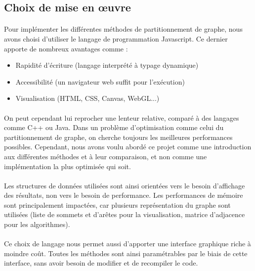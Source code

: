 \documentclass[12pt]{article}
\begin{document}
\subsection{Choix de mise en œuvre}

\paragraph{}Pour implémenter les différentes méthodes de partitionnement de graphe, nous avons choisi d'utiliser le langage de programmation Javascript. Ce dernier apporte de nombreux avantages comme :
\begin{itemize}
	\item Rapidité d'écriture (langage interprété à typage dynamique)
	\item Accessibilité (un navigateur web suffit pour l'exécution)
	\item Visualisation (HTML, CSS, Canvas, WebGL...)
\end{itemize}

\paragraph{}On peut cependant lui reprocher une lenteur relative, comparé à des langages comme C++ ou Java. Dans un problème d'optimisation comme celui du partitionnement de graphe, on cherche toujours les meilleures performances possibles. Cependant, nous avons voulu abordé ce projet comme une introduction aux différentes méthodes et à leur comparaison, et non comme une implémentation la plus optimisée qui soit.

\paragraph{}Les structures de données utilisées sont ainsi orientées vers le besoin d'affichage des résultats, non vers le besoin de performance. Les performances de mémoire sont principalement impactées, car plusieurs représentation du graphe sont utilisées (liste de sommets et d'arêtes pour la visualisation, matrice d'adjacence pour les algorithmes).

\paragraph{}Ce choix de langage nous permet aussi d'apporter une interface graphique riche à moindre coût. Toutes les méthodes sont ainsi paramétrables par le biais de cette interface, sans avoir besoin de modifier et de recompiler le code.
\end{document}
